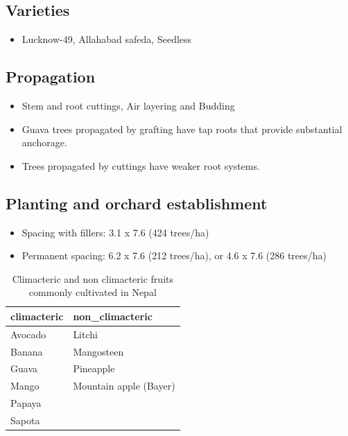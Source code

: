 \documentclass[
  openany]{book}
\providecommand{\tightlist}{%
  \setlength{\itemsep}{0pt}\setlength{\parskip}{0pt}}
\begin{document}
\hypertarget{varieties}{%
\subsection{Varieties}\label{varieties}}

\begin{itemize}
\tightlist
\item
  Lucknow-49, Allahabad safeda, Seedless
\end{itemize}

\hypertarget{propagation}{%
\subsection{Propagation}\label{propagation}}

\begin{itemize}
\tightlist
\item
  Stem and root cuttings, Air layering and Budding
\item
  Guava trees propagated by grafting have tap roots that provide substantial anchorage.
\item
  Trees propagated by cuttings have weaker root
  systems.
\end{itemize}

\hypertarget{planting-and-orchard-establishment}{%
\subsection{Planting and orchard establishment}\label{planting-and-orchard-establishment}}

\begin{itemize}
\tightlist
\item
  Spacing with fillers: 3.1 x 7.6 (424 trees/ha)
\item
  Permanent spacing: 6.2 x 7.6 (212 trees/ha), or 4.6 x 7.6 (286 trees/ha)
\end{itemize}

\begin{table}

\caption{\label{tab:climac-vs-nonclim}Climacteric and non climacteric fruits commonly cultivated in Nepal}
\centering
\begin{tabular}[t]{ll}
\toprule
climacteric & non\_climacteric\\
\midrule
\rowcolor{gray!6}  Avocado & Litchi\\
Banana & Mangosteen\\
\rowcolor{gray!6}  Guava & Pineapple\\
Mango & Mountain apple (Bayer)\\
\rowcolor{gray!6}  Papaya & \\
\addlinespace
Sapota & \\
\bottomrule
\end{tabular}
\end{table}
\end{document}
